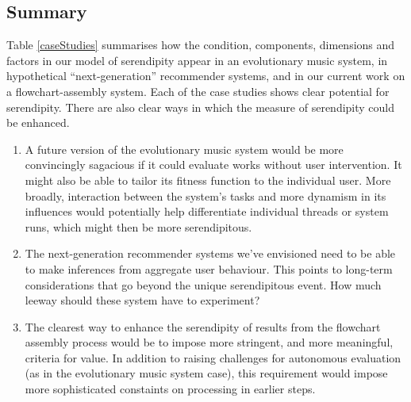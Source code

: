 \subsection{Summary}

Table \ref{caseStudies} summarises how the condition, components,
dimensions and factors in our model of serendipity appear in an
evolutionary music system, in hypothetical ``next-generation''
recommender systems, and in our current work on a flowchart-assembly
system.  Each of the case studies shows clear potential for
serendipity.  There are also clear ways in which the measure of
serendipity could be enhanced.

\begin{enumerate}
\item A future version of the evolutionary music system would be more
  convincingly sagacious if it could evaluate works without user
  intervention.  It might also be able to tailor its fitness function
  to the individual user.  More broadly, interaction between the
  system's tasks and more dynamism in its influences would potentially
  help differentiate individual threads or system runs, which might
  then be more serendipitous.

\item The next-generation recommender systems we've envisioned need to
  be able to make inferences from aggregate user behaviour.  This
  points to long-term considerations that go beyond the unique
  serendipitous event.  How much leeway should these system have to
  experiment?  

\item The clearest way to enhance the serendipity of results from the
  flowchart assembly process would be to impose more stringent, and
  more meaningful, criteria for value.  In addition to raising
  challenges for autonomous evaluation (as in the evolutionary music
  system case), this requirement would impose more sophisticated
  constaints on processing in earlier steps.
\end{enumerate}


